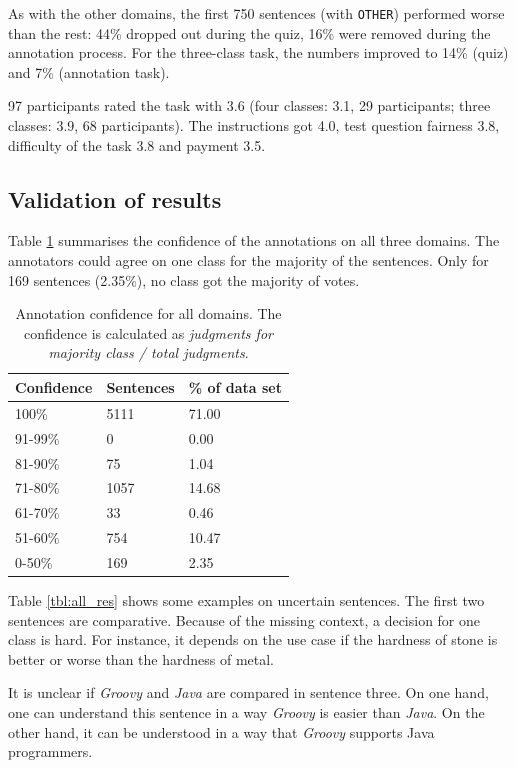 As with the other domains, the first 750 sentences (with \texttt{OTHER}) performed worse than the rest: 44\% dropped out during the quiz, 16\% were removed during the annotation process. For the three-class task, the numbers improved to 14\% (quiz) and 7\% (annotation task).

97 participants rated the task with 3.6 (four classes: 3.1, 29 participants; three classes: 3.9, 68 participants). The instructions got 4.0, test question fairness 3.8, difficulty of the task 3.8 and payment 3.5.


\subsection{Validation of results}
Table \ref{fig:all_agg} summarises the confidence of the annotations on all three domains. The annotators could agree on one class for the majority of the sentences. Only for 169 sentences (2.35\%), no class got the majority of votes. 

\begin{table}[hp]
\caption{Annotation confidence for all domains. The confidence is calculated as \emph{judgments for majority class / total judgments}.}
\label{fig:all_agg}
\begin{tabularx}{\textwidth}{XXX}
\toprule
Confidence & Sentences & \% of data set \\
\midrule
100\%	&	5111	&	71.00	 \\ 
91-99\%	&	0	&	0.00	 \\ 
81-90\%	&	75	&	1.04	 \\ 
71-80\%	&	1057	&	14.68	 \\ 
61-70\%	&	33	&	0.46	 \\ 
51-60\%	&	754	&	10.47	 \\ 
0-50\%	&	169	&	2.35	 \\ 
\bottomrule
\end{tabularx}
\end{table}

Table \ref{tbl:all_res} shows some examples on uncertain sentences. The first two sentences are comparative. Because of the missing context, a decision for one class is hard. For instance, it depends on the use case if the hardness of stone is better or worse than the hardness of metal.

It is unclear if \emph{Groovy} and \emph{Java} are compared in sentence three. On one hand, one can understand this sentence in a way \emph{Groovy} is easier than \emph{Java}. On the other hand, it can be understood in a way that \emph{Groovy} supports Java programmers.

